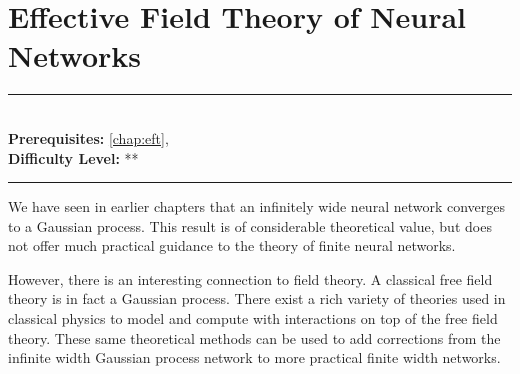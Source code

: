 \documentclass[book.tex]{subfiles}
\begin{document}
\chapter{Effective Field Theory of Neural Networks}
\label{chap:hopfield}
\noindent\rule{11cm}{0.4pt} \\
\textbf{Prerequisites:}  \autoref{chap:eft},   \\
\textbf{Difficulty Level:} ** \\
\noindent\rule{11cm}{0.4pt}
\vspace{5mm}

We have seen in earlier chapters that an infinitely wide neural network converges to a Gaussian process. This result is of considerable theoretical value, but does not offer much practical guidance to the theory of finite neural networks. 

However, there is an interesting connection to field theory. A classical free field theory is in fact a Gaussian process. There exist a rich variety of theories used in classical physics to model and compute with interactions on top of the free field theory. These same theoretical methods can be used to add corrections from the infinite width Gaussian process network to more practical finite width networks.


\end{document}
